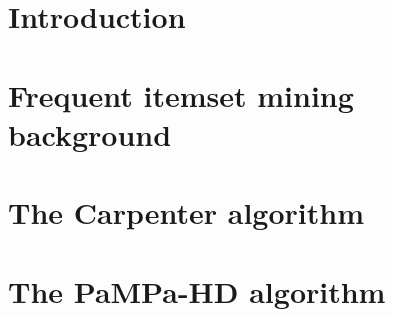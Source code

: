 \documentclass[preprint,review,12pt]{elsarticle}
\begin{document}

\section{Introduction}
\label{Introduction}



\section{Frequent itemset mining background}
\label{Preliminaries}




\section{The Carpenter algorithm}
\label{Carpenter algorithm}



\section{The PaMPa-HD algorithm}
\label{Distributed implementation outline}

\end{document}
